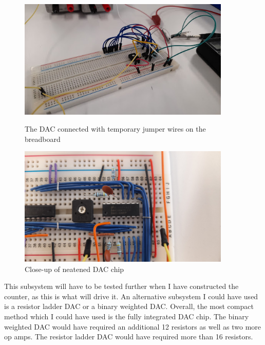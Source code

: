 \begin{figure}[H]
    \centering
        \begin{minipage}[t]{0.45\textwidth}
        \centering
        \includegraphics[width=0.9\textwidth]{images/dacTesting3.jpg}
        \caption{The DAC connected with temporary jumper wires on the breadboard}
        \label{fig:dacTesting3}
    \end{minipage} \hfill
    \begin{minipage}[t]{0.45\textwidth}
        \centering
        \includegraphics[width=0.9\textwidth]{images/dacNeatened.jpg}
        \caption{Close-up of neatened DAC chip}
        \label{fig:dacNeatenedCloseUp}
    \end{minipage}
\end{figure}
\noindent This subsystem will have to be tested further when I have constructed the counter, as this is what will drive it. \newline
An alternative subsystem I could have used is a resistor ladder DAC or a binary weighted DAC. Overall, the most compact method which I could have used is the fully integrated DAC chip. The binary weighted DAC would have required an additional 12 resistors as well as two more op amps. The resistor ladder DAC would have required more than 16 resistors. 
